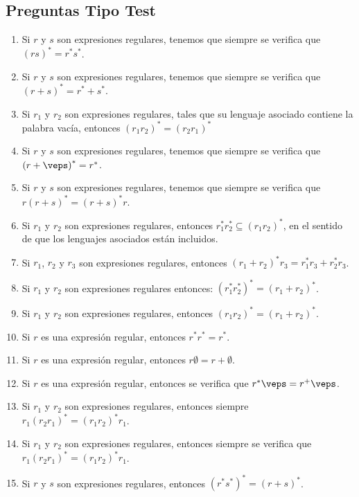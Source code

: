 \subsection{Preguntas Tipo Test}
\begin{enumerate}
    \item Si $r$ y $s$ son expresiones regulares, tenemos que siempre se verifica que ${(rs)}^{\ast}=r^\ast s^\ast$.
    \item Si $r$ y $s$ son expresiones regulares, tenemos que siempre se verifica que ${(r+s)}^{\ast} = r^\ast + s^\ast$.
    \item Si $r_1$ y $r_2$ son expresiones regulares, tales que su lenguaje asociado contiene la palabra vacía, entonces ${(r_1r_2)}^{\ast}={(r_2r_1)}^{\ast}$
    \item Si $r$ y $s$ son expresiones regulares, tenemos que siempre se verifica que ${(r+\veps )}^{\ast}=r^\ast$.
    \item Si $r$ y $s$ son expresiones regulares, tenemos que siempre se verifica que $r{(r+s)}^{\ast}={(r+s)}^{\ast}r$.
    \item Si $r_1$ y $r_2$ son expresiones regulares, entonces $r_1^\ast r_2^\ast \subseteq {(r_1r_2)}^{\ast}$, en el sentido de que los lenguajes asociados están incluidos.
    \item Si $r_1$, $r_2$ y $r_3$ son expresiones regulares, entonces ${(r_1+r_2)}^{\ast}r_3=r_1^\ast r_3 + r_2^\ast r_3$.
    \item Si $r_1$ y $r_2$ son expresiones regulares entonces: ${(r_1^\ast r_2^\ast)}^{\ast}={(r_1+r_2)}^{\ast}$.
    \item Si $r_1$ y $r_2$ son expresiones regulares, entonces ${(r_1r_2)}^{\ast}={(r_1+r_2)}^{\ast}$.
    \item Si $r$ es una expresión regular, entonces $r^\ast r^\ast = r^\ast$.
    \item Si $r$ es una expresión regular, entonces $r\emptyset =r+\emptyset $.
    \item Si $r$ es una expresión regular, entonces se verifica que $r^\ast\veps =r^+\veps$.
    \item Si $r_1$ y $r_2$ son expresiones regulares, entonces siempre $r_1{(r_2r_1)}^{\ast}={(r_1r_2)}^{\ast}r_1$.
    \item Si $r_1$ y $r_2$ son expresiones regulares, entonces siempre se verifica que $r_1{(r_2r_1)}^{\ast}={(r_1r_2)}^{\ast}r_1$.
    \item Si $r$ y $s$ son expresiones regulares, entonces ${(r^\ast s^\ast)}^{\ast}={(r+s)}^{\ast}$.

\end{enumerate}
